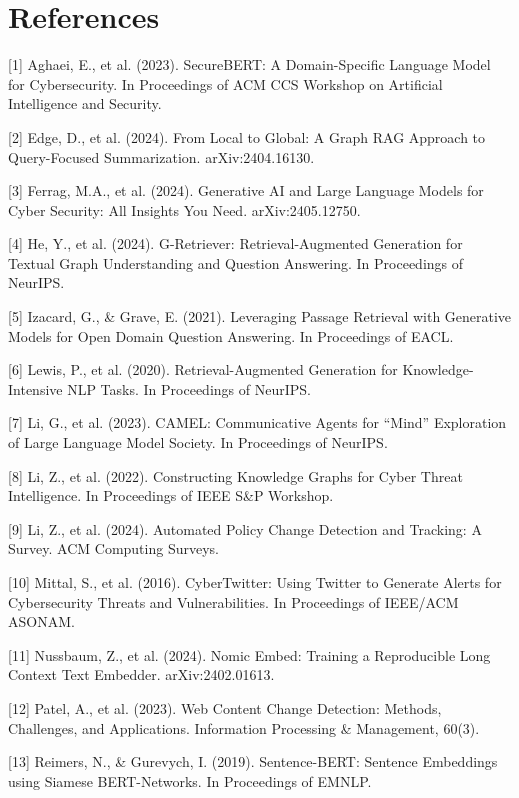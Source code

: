 \documentclass[
]{article}
\begin{document}
\section{References}\label{references}

{[}1{]} Aghaei, E., et al. (2023). SecureBERT: A Domain-Specific
Language Model for Cybersecurity. In Proceedings of ACM CCS Workshop on
Artificial Intelligence and Security.

{[}2{]} Edge, D., et al. (2024). From Local to Global: A Graph RAG
Approach to Query-Focused Summarization. arXiv:2404.16130.

{[}3{]} Ferrag, M.A., et al. (2024). Generative AI and Large Language
Models for Cyber Security: All Insights You Need. arXiv:2405.12750.

{[}4{]} He, Y., et al. (2024). G-Retriever: Retrieval-Augmented
Generation for Textual Graph Understanding and Question Answering. In
Proceedings of NeurIPS.

{[}5{]} Izacard, G., \& Grave, E. (2021). Leveraging Passage Retrieval
with Generative Models for Open Domain Question Answering. In
Proceedings of EACL.

{[}6{]} Lewis, P., et al. (2020). Retrieval-Augmented Generation for
Knowledge-Intensive NLP Tasks. In Proceedings of NeurIPS.

{[}7{]} Li, G., et al. (2023). CAMEL: Communicative Agents for ``Mind''
Exploration of Large Language Model Society. In Proceedings of NeurIPS.

{[}8{]} Li, Z., et al. (2022). Constructing Knowledge Graphs for Cyber
Threat Intelligence. In Proceedings of IEEE S\&P Workshop.

{[}9{]} Li, Z., et al. (2024). Automated Policy Change Detection and
Tracking: A Survey. ACM Computing Surveys.

{[}10{]} Mittal, S., et al. (2016). CyberTwitter: Using Twitter to
Generate Alerts for Cybersecurity Threats and Vulnerabilities. In
Proceedings of IEEE/ACM ASONAM.

{[}11{]} Nussbaum, Z., et al. (2024). Nomic Embed: Training a
Reproducible Long Context Text Embedder. arXiv:2402.01613.

{[}12{]} Patel, A., et al. (2023). Web Content Change Detection:
Methods, Challenges, and Applications. Information Processing \&
Management, 60(3).

{[}13{]} Reimers, N., \& Gurevych, I. (2019). Sentence-BERT: Sentence
Embeddings using Siamese BERT-Networks. In Proceedings of EMNLP.
\end{document}
